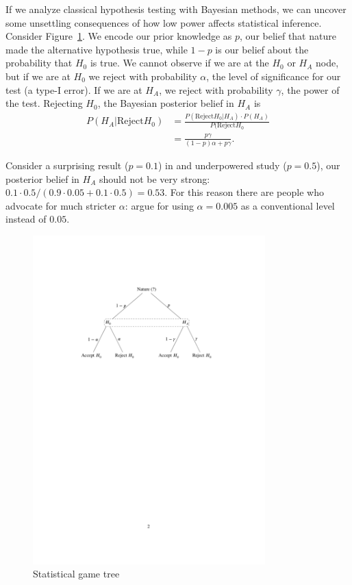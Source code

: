 \documentclass[twoside]{article}
\begin{document}
If we analyze classical hypothesis testing with Bayesian methods, we can uncover some
unsettling consequences of how low power affects statistical inference. 
Consider Figure~\ref{fig:B}. We encode our prior knowledge as $p$, our belief that
nature made the alternative hypothesis true, while $1-p$ is our belief about
the probability that $H_0$ is true. We cannot observe if we are at the $H_0$ or $H_A$ node,
but if we are at $H_0$ we reject with probability $\alpha$, the level of significance for our
test (a type-I error). If we are at $H_A$, we reject with probability $\gamma$, the power of the
test. Rejecting $H_0$, the Bayesian posterior belief in $H_A$ is
\begin{align*}
   P(H_A|\mathrm{Reject} H_0) & = \frac{P(\mathrm{Reject} H_0|H_A) \cdot P(H_A)}{P(\mathrm{Reject} H_0} \\
   &= \frac{p\gamma}{(1-p)\alpha + p\gamma}.  
\end{align*}

Consider a surprising result ($p=0.1$) in and underpowered study ($p=0.5$), our posterior belief
in $H_A$ should not be very strong: $0.1\cdot 0.5 / (0.9\cdot 0.05 + 0.1\cdot 0.5) = 0.53$.
For this reason there are people who advocate for much stricter $\alpha$: \citet{Benjamin2017} argue
for using $\alpha=0.005$ as a conventional level instead of $0.05$. 

\begin{figure}[tb]
  \begin{center}
\includegraphics[width=0.8\textwidth]{../graphs/B.pdf}
  \end{center}
\caption{Statistical game tree}\label{fig:B}
\end{figure}
\end{document}
